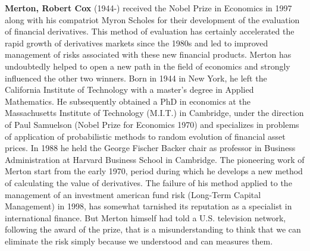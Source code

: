 \textbf{Merton, Robert Cox} (1944-) received the Nobel Prize in Economics in 1997 along with his compatriot Myron Scholes for their development of the evaluation of financial derivatives. This method of evaluation has certainly accelerated the rapid growth of derivatives markets since the 1980s and led to improved management of risks associated with these new financial products. Merton has undoubtedly helped to open a new path in the field of economics and strongly influenced the other two winners. Born in 1944 in New York, he left the California Institute of Technology with a master's degree in Applied Mathematics. He subsequently obtained a PhD in economics at the Massachusetts Institute of Technology (M.I.T.) in Cambridge, under the direction of Paul Samuelson (Nobel Prize for Economics 1970) and specializes in problems of application of probabilistic methods to random evolution of financial asset prices. In 1988 he held the George Fischer Backer chair as professor in Business Administration at Harvard Business School in Cambridge. The pioneering work of Merton start from the early 1970, period during which he develops a new method of calculating the value of derivatives. The failure of his method applied to the management of an investment american fund risk (Long-Term Capital Management) in 1998, has somewhat tarnished its reputation as a specialist in international finance. But Merton himself had told a U.S. television network, following the award of the prize, that is a misunderstanding to think that we can eliminate the risk simply because we understood and can measures them.


